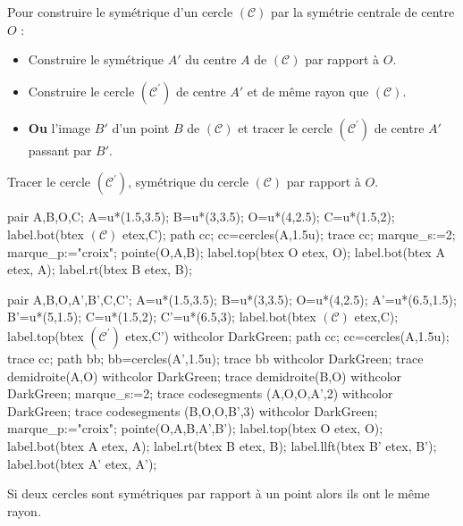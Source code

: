 \begin{methode}
    Pour construire le symétrique d'un cercle $(\mathcal{C})$ par la symétrie centrale de centre $O$ :
    \begin{itemize}
        \item Construire le symétrique $A'$ du centre $A$ de $(\mathcal{C})$ par rapport à $O$.
        \item Construire le cercle $(\mathcal{C}^{'})$ de centre $A'$ et de même rayon que $(\mathcal{C})$.
        \item {\bfseries Ou} l'image $B'$ d'un point $B$ de $(\mathcal{C})$ et tracer le cercle $(\mathcal{C}^{'})$ de centre $A'$ passant par $B'$.
    \end{itemize}
    \exercice
    Tracer le cercle $(\mathcal{C}^{'})$, symétrique du cercle $(\mathcal{C})$ par rapport à $O$.
    
    \bigskip
    \begin{Geometrie}[CoinHD={(8u,5u)}]
        pair A,B,O,C;
        A=u*(1.5,3.5);
        B=u*(3,3.5);
        O=u*(4,2.5);
        C=u*(1.5,2);
        label.bot(btex $({\mathcal C})$ etex,C);        
        path cc;
        cc=cercles(A,1.5u);
        trace cc;
        marque_s:=2;
        marque_p:="croix";
        pointe(O,A,B);
        label.top(btex O etex, O);
        label.bot(btex A etex, A);
        label.rt(btex B etex, B);
    \end{Geometrie}
    \correction
    \begin{Geometrie}[CoinHD={(8u,5u)}]
        pair A,B,O,A',B',C,C';
        A=u*(1.5,3.5);
        B=u*(3,3.5);
        O=u*(4,2.5);
        A'=u*(6.5,1.5);
        B'=u*(5,1.5);
        C=u*(1.5,2);
        C'=u*(6.5,3);
        label.bot(btex $({\mathcal C})$ etex,C);
        label.top(btex $({\mathcal C}^{'})$ etex,C') withcolor DarkGreen;
        path cc;
        cc=cercles(A,1.5u);
        trace cc;
        path bb;
        bb=cercles(A',1.5u);
        trace bb withcolor DarkGreen;
        trace demidroite(A,O) withcolor DarkGreen;
        trace demidroite(B,O) withcolor DarkGreen;
        marque_s:=2;
        trace codesegments (A,O,O,A',2) withcolor DarkGreen;
        trace codesegments (B,O,O,B',3) withcolor DarkGreen;
        marque_p:="croix";
        pointe(O,A,B,A',B');
        label.top(btex O etex, O);
        label.bot(btex A etex, A);
        label.rt(btex B etex, B);
        label.llft(btex B' etex, B');
        label.bot(btex A' etex, A'); 
    \end{Geometrie}
\end{methode}

\begin{propriete}[\admise]
    Si deux cercles sont symétriques par rapport à un point alors ils ont le même rayon.
\end{propriete}